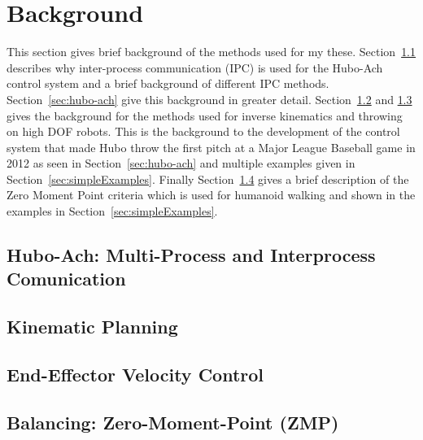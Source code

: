 \chapter{Background}\label{sec:background}

This section gives brief background of the methods used for my these.
Section~\ref{sec:back:hubo-ach} describes why inter-process communication (IPC) is used for the Hubo-Ach control system and a brief background of different IPC methods.
Section~\ref{sec:hubo-ach} give this background in greater detail.
Section~\ref{sec:back:ik} and \ref{sec:back:eefvelos} gives the background for the methods used for inverse kinematics and throwing on high DOF robots.
This is the background to the development of the control system that made Hubo throw the first pitch at a Major League Baseball game in 2012 as seen in Section~\ref{sec:hubo-ach} and multiple examples given in Section~\ref{sec:simpleExamples}.
Finally Section~\ref{sec:zmp} gives a brief description of the Zero Moment Point criteria which is used for humanoid walking and shown in the examples in Section~\ref{sec:simpleExamples}.

		
		\section{Hubo-Ach: Multi-Process and Interprocess Comunication}\label{sec:back:hubo-ach}
	    		
		\section{Kinematic Planning}\label{sec:back:ik}
			
		\section{End-Effector Velocity Control}\label{sec:back:eefvelos}
			
%			
		\section{Balancing: Zero-Moment-Point (ZMP)}\label{sec:zmp}
			
